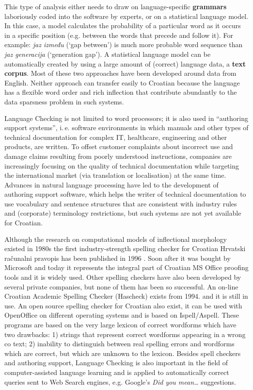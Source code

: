 \begin{multicols}{2}
This type of analysis either needs to draw on language-specific \textbf{grammars} laboriously coded into the software by experts, or on a statistical language model. In this case, a model calculates the probability of a particular word as it occurs in a specific position (e.g. between the words that precede and follow it). For example: \emph{jaz između} (‘gap between’) is much more probable word sequence than \emph{jaz generacija} (‘generation gap’). A statistical language model can be automatically created by using a large amount of (correct) language data, a \textbf{text corpus}. Most of these two approaches have been developed around data from English. Neither approach can transfer easily to Croatian because the language has a flexible word order and rich inflection that contribute abundantly to the data sparsness problem in such systems.

Language Checking is not limited to word processors; it is also used in “authoring support systems”, i.\,e. software environments in which manuals and other types of technical documentation for complex IT, healthcare, engineering and other products, are written. To offset customer complaints about incorrect use and damage claims resulting from poorly understood instructions, companies are increasingly focusing on the quality of technical documentation while targeting the international market (via translation or localisation) at the same time. Advances in natural language processing have led to the development of authoring support software, which helps the writer of technical documentation to use vocabulary and sentence structures that are consistent with industry rules and (corporate) terminology restrictions, but such systems are not yet available for Croatian.


Although the research on computational models of inflectional morphology existed in 1980s the first industry-strength spelling checker for Croatian Hrvatski računalni pravopis has been published in 1996 \cite{boo2}. Soon after it was bought by Microsoft and today it represents the integral part of Croatian MS Office proofing tools and it is widely used. Other spelling checkers have also been developed by several private companies, but none of them has been so successful. An on-line Croatian Academic Spelling Checker (Hascheck) \cite{str13} exists from 1994. and it is still in use. An open source spelling checker for Croatian also exist, it can be used with OpenOffice on different operating systems and is based on Ispell/Aspell. These programs are based on the very large lexicon of correct wordforms which have two drawbacks: 1) strings that represent correct wordforms appearing in a wrong co text; 2) inability to distinguish between real spelling errors and wordforms which are correct, but which are unknown to the lexicon. Besides spell checkers and authoring support, Language Checking is also important in the field of computer-assisted language learning and is applied to automatically correct queries sent to Web Search engines, e.g. Google’s \textit{Did you mean…} suggestions. 


\end{multicols}
